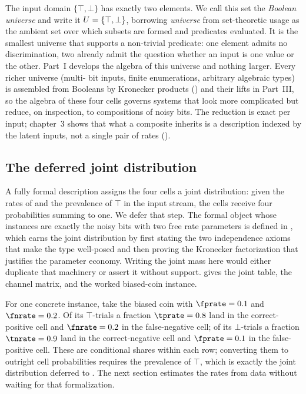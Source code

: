 The input domain $\{\top, \bot\}$ has exactly two elements. We call this set
the \emph{Boolean universe} and write it $U = \{\top, \bot\}$, borrowing
\emph{universe} from set-theoretic usage as the ambient set over which subsets
are formed and predicates evaluated. It is the smallest universe that supports
a non-trivial predicate: one element admits no discrimination, two already
admit the question whether an input is one value or the other. Part~I develops
the algebra of this universe and nothing larger. Every richer universe (multi-
bit inputs, finite enumerations, arbitrary algebraic types) is assembled from
Booleans by Kronecker products () and their lifts in
Part~III, so the algebra of these four cells governs systems that look more
complicated but reduce, on inspection, to compositions of noisy bits. The
reduction is exact per input; chapter~3 shows that what a composite inherits
is a description indexed by the latent inputs, not a single pair of rates
().

\subsection*{The deferred joint distribution}

A fully formal description assigns the four cells a joint distribution: given
the rates of  and the prevalence of $\top$ in the
input stream, the cells receive four probabilities summing to one. We defer
that step. The formal object whose instances are exactly the noisy bits with
two free rate parameters is defined in , which
earns the joint distribution by first stating the two independence axioms that
make the type well-posed and then proving the Kronecker factorization that
justifies the parameter economy. Writing the joint mass here would either
duplicate that machinery or assert it without support. 
gives the joint table, the channel matrix, and the worked biased-coin instance.

For one concrete instance, take the biased coin with $\fprate = 0.1$ and
$\fnrate = 0.2$. Of its $\top$-trials a fraction $\tprate = 0.8$ land in the
correct-positive cell and $\fnrate = 0.2$ in the false-negative cell; of its
$\bot$-trials a fraction $\tnrate = 0.9$ land in the correct-negative cell and
$\fprate = 0.1$ in the false-positive cell. These are conditional shares within
each row; converting them to outright cell probabilities requires the prevalence
of $\top$, which is exactly the joint distribution deferred to
. The next section estimates the rates from
data without waiting for that formalization.
